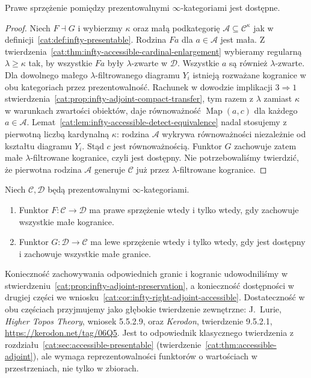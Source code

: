 \begin{wniosek}\label{cat:cor:infty-right-adjoint-accessible}
Prawe sprzężenie pomiędzy prezentowalnymi $\infty$-kategoriami jest dostępne.
\end{wniosek}
\begin{proof}
Niech $F\dashv G$ i wybierzmy $\kappa$ oraz małą podkategorię $\mathcal A\subseteq\mathcal C^\kappa$ jak w definicji~\ref{cat:def:infty-presentable}. Rodzina $Fa$ dla $a\in\mathcal A$ jest mała. Z twierdzenia~\ref{cat:thm:infty-accessible-cardinal-enlargement} wybieramy regularną $\lambda\geq\kappa$ tak, by wszystkie $Fa$ były $\lambda$-zwarte w $\mathcal D$. Wszystkie $a$ są również $\lambda$-zwarte. Dla dowolnego małego $\lambda$-filtrowanego diagramu $Y_i$ istnieją rozważane kogranice w obu kategoriach przez prezentowalność. Rachunek w dowodzie implikacji $3\Rightarrow1$ stwierdzenia~\ref{cat:prop:infty-adjoint-compact-transfer}, tym razem z $\lambda$ zamiast $\kappa$ w warunkach zwartości obiektów, daje równoważność $\operatorname{Map}(a,c)$ dla każdego $a\in\mathcal A$. Lemat~\ref{cat:lem:infty-accessible-detect-equivalence} nadal stosujemy z pierwotną liczbą kardynalną $\kappa$: rodzina $\mathcal A$ wykrywa równoważności niezależnie od kształtu diagramu $Y_i$. Stąd $c$ jest równoważnością. Funktor $G$ zachowuje zatem małe $\lambda$-filtrowane kogranice, czyli jest dostępny. Nie potrzebowaliśmy twierdzić, że pierwotna rodzina $\mathcal A$ generuje $\mathcal C$ już przez $\lambda$-filtrowane kogranice.
\end{proof}

\begin{twierdzenie}\label{cat:thm:infty-presentable-adjoint}
Niech $\mathcal C,\mathcal D$ będą prezentowalnymi $\infty$-kategoriami.
\begin{enumerate}
 \item Funktor $F:\mathcal C\to\mathcal D$ ma prawe sprzężenie wtedy i tylko wtedy, gdy zachowuje wszystkie małe kogranice.
 \item Funktor $G:\mathcal D\to\mathcal C$ ma lewe sprzężenie wtedy i tylko wtedy, gdy jest dostępny i zachowuje wszystkie małe granice.
\end{enumerate}
\end{twierdzenie}

Konieczność zachowywania odpowiednich granic i kogranic udowodniliśmy w stwierdzeniu~\ref{cat:prop:infty-adjoint-preservation}, a konieczność dostępności w drugiej części we wniosku~\ref{cat:cor:infty-right-adjoint-accessible}. Dostateczność w obu częściach przyjmujemy jako głębokie twierdzenie zewnętrzne: J.~Lurie, \emph{Higher Topos Theory}, wniosek 5.5.2.9, oraz \emph{Kerodon}, twierdzenie 9.5.2.1, \url{https://kerodon.net/tag/06Q5}. Jest to odpowiednik klasycznego twierdzenia z rozdziału~\ref{cat:sec:accessible-presentable} (twierdzenie~\ref{cat:thm:accessible-adjoint}), ale wymaga reprezentowalności funktorów o wartościach w przestrzeniach, nie tylko w zbiorach.

